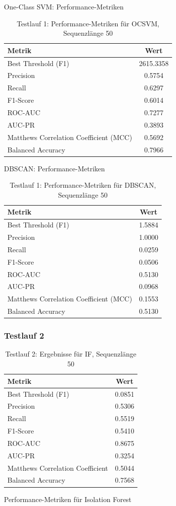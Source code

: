 \documentclass[a4paper,12pt]{article}
\begin{document}
\begin{table}[H]
	\centering
	\caption{One-Class SVM: Performance-Metriken}
	\begin{tabular}{l c}
		\hline
		Metrik & Wert \\
		\hline
		Best Threshold (F1) & 2615.3358 \\
		Precision & 0.5754 \\
		Recall & 0.6297 \\
		F1-Score & 0.6014 \\
		ROC-AUC & 0.7277 \\
		AUC-PR & 0.3893 \\
		Matthews Correlation Coefficient (MCC) & 0.5692 \\
		Balanced Accuracy & 0.7966 \\
		\hline
	\end{tabular}
	\caption{Testlauf 1: Performance-Metriken für OCSVM, Sequenzlänge 50}
\end{table}

\begin{table}[H]
	\centering
	\caption{DBSCAN: Performance-Metriken}
	\begin{tabular}{l c}
		\hline
		Metrik & Wert \\
		\hline
		Best Threshold (F1) & 1.5884 \\
		Precision & 1.0000 \\
		Recall & 0.0259 \\
		F1-Score & 0.0506 \\
		ROC-AUC & 0.5130 \\
		AUC-PR & 0.0968 \\
		Matthews Correlation Coefficient (MCC) & 0.1553 \\
		Balanced Accuracy & 0.5130 \\
		\hline
	\end{tabular}
	\caption{Testlauf 1: Performance-Metriken für DBSCAN, Sequenzlänge 50}
\end{table}

\subsubsection{Testlauf 2}

\begin{table}[H]
	\centering
	\begin{tabular}{l c}
		\toprule
		\textbf{Metrik} & \textbf{Wert} \\
		\midrule
		Best Threshold (F1) & 0.0851 \\
		Precision & 0.5306 \\
		Recall & 0.5519 \\
		F1-Score & 0.5410 \\
		ROC-AUC & 0.8675 \\
		AUC-PR & 0.3254 \\
		Matthews Correlation Coefficient & 0.5044 \\
		Balanced Accuracy & 0.7568 \\
		\bottomrule
	\end{tabular}
	\caption{Performance-Metriken für Isolation Forest}
	\caption{Testlauf 2: Ergebnisse für IF, Sequenzlänge 50}
\end{table}
\end{document}

